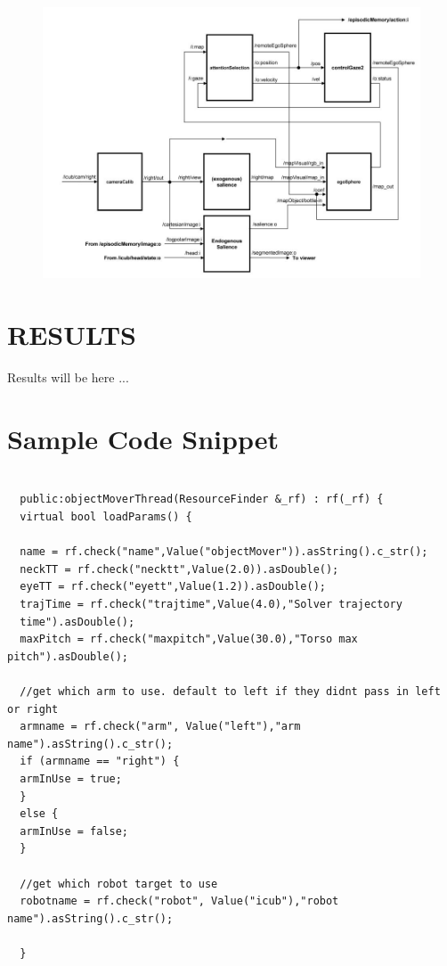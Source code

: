 \documentclass[a4paper, 11pt]{report}
\begin{document}
  
  \begin{figure}[h!]
    \centering
    \includegraphics[width=0.9\linewidth]{cognitive_architecture_A}
    \caption{}
    \label{fig:cognitive_architecture_A}
  \end{figure}
  
  
  \chapter{RESULTS}
  
  Results will be here ...
  
  \appendix
  \chapter{Sample Code Snippet}
  
  
  \begin{lstlisting}
  
  public:objectMoverThread(ResourceFinder &_rf) : rf(_rf) {
  virtual bool loadParams() {
  
  name = rf.check("name",Value("objectMover")).asString().c_str();
  neckTT = rf.check("necktt",Value(2.0)).asDouble();
  eyeTT = rf.check("eyett",Value(1.2)).asDouble();
  trajTime = rf.check("trajtime",Value(4.0),"Solver trajectory 
  time").asDouble();
  maxPitch = rf.check("maxpitch",Value(30.0),"Torso max pitch").asDouble();
  
  //get which arm to use. default to left if they didnt pass in left or right
  armname = rf.check("arm", Value("left"),"arm name").asString().c_str();
  if (armname == "right") {
  armInUse = true;
  }
  else {
  armInUse = false;
  }
  
  //get which robot target to use
  robotname = rf.check("robot", Value("icub"),"robot name").asString().c_str();
  
  }
  \end{lstlisting}
  
\end{document}
